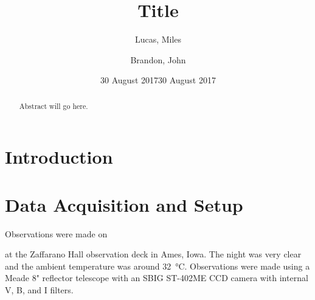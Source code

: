 \documentclass[%
aip,
jmp,
reprint,
]{revtex4-1}
\begin{document}
	
	\title[Short title]{Title}
	
	\author{Lucas, Miles}
	\author{Brandon, John}
	
	\date{30 August 2017}
	
	

	\begin{abstract}
	
	Abstract will go here.
		
	\end{abstract}
	
	\maketitle
	

	\section{Introduction}
	
	


	\section{Data Acquisition and Setup}
	Observations were made on \date{30 August 2017} at the Zaffarano Hall observation deck in Ames, Iowa. The night was very clear and the ambient temperature was around \SI{32}{\degreeCelsius}. Observations were made using a Meade 8" reflector telescope with an SBIG ST-402ME CCD camera with internal V, B, and I filters. 
	
\end{document}
